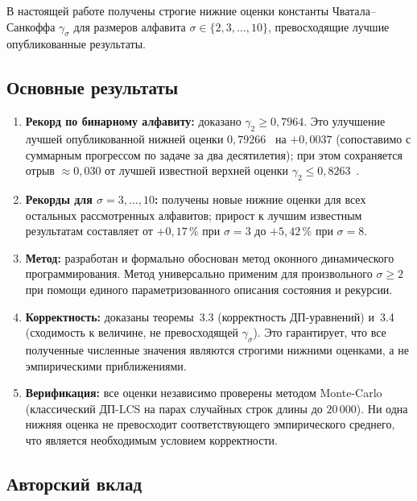 В настоящей работе получены строгие нижние оценки константы Чватала--Санкоффа $\gamma_\sigma$ для размеров алфавита $\sigma \in \{2, 3, \ldots, 10\}$, превосходящие лучшие опубликованные результаты.

\subsection*{Основные результаты}

\begin{enumerate}
    \item \textbf{Рекорд по бинарному алфавиту:} доказано $\gamma_2 \geq 0{,}7964$. Это улучшение лучшей опубликованной нижней оценки $0{,}79266$~\cite{heineman2024} на $+0{,}0037$ (сопоставимо с суммарным прогрессом по задаче за два десятилетия); при этом сохраняется отрыв $\approx 0{,}030$ от лучшей известной верхней оценки $\gamma_2 \leq 0{,}8263$~\cite{lueker2009}.

    \item \textbf{Рекорды для $\sigma = 3, \ldots, 10$:} получены новые нижние оценки для всех остальных рассмотренных алфавитов; прирост к лучшим известным результатам составляет от $+0{,}17\,\%$ при $\sigma = 3$ до $+5{,}42\,\%$ при $\sigma = 8$.

    \item \textbf{Метод:} разработан и формально обоснован метод оконного динамического программирования. Метод универсально применим для произвольного $\sigma \geq 2$ при помощи единого параметризованного описания состояния и рекурсии.

    \item \textbf{Корректность:} доказаны теоремы~3.3 (корректность ДП-уравнений) и~3.4 (сходимость к величине, не превосходящей $\gamma_\sigma$). Это гарантирует, что все полученные численные значения являются строгими нижними оценками, а не эмпирическими приближениями.

    \item \textbf{Верификация:} все оценки независимо проверены методом Monte-Carlo (классический ДП-LCS на парах случайных строк длины до $20\,000$). Ни одна нижняя оценка не превосходит соответствующего эмпирического среднего, что является необходимым условием корректности.
\end{enumerate}

\subsection*{Авторский вклад}

